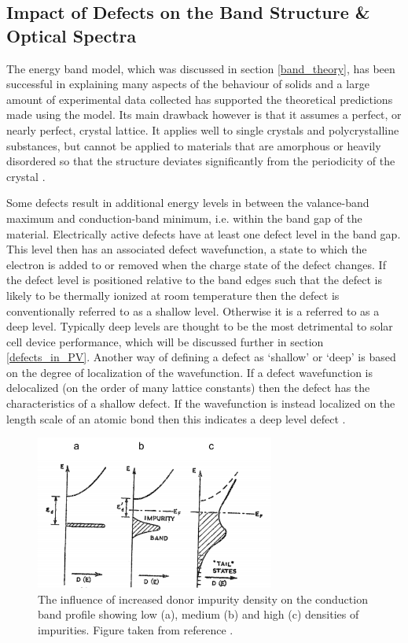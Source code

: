 \subsection{Impact of Defects on the Band Structure \& Optical Spectra}\label{PL_section}
The energy band model, which was discussed in section \ref{band_theory}, has been successful in explaining many aspects of the behaviour of solids and a large amount of experimental data collected has supported the theoretical predictions made using the model. Its main drawback however is that it assumes a perfect, or nearly perfect, crystal lattice. It applies well to single crystals and polycrystalline substances, but cannot be applied to materials that are amorphous or heavily disordered so that the structure deviates significantly from the periodicity of the crystal \cite{small_semiconductor1}. 

Some defects result in additional energy levels in between the valance-band maximum and conduction-band minimum, i.e. within the band gap of the material. Electrically active defects have at least one defect level in the band gap. This level then has an associated defect wavefunction, a state to which the electron is added to or removed when the charge state of the defect changes. If the defect level is positioned relative to the band edges such that the defect is likely to be thermally ionized at room temperature then the defect is conventionally referred to as a shallow level. Otherwise it is a referred to as a deep level. Typically deep levels are thought to be the most detrimental to solar cell device performance, which will be discussed further in section \ref{defects_in_PV}. Another way of defining a defect as `shallow' or `deep' is based on the degree of localization of the wavefunction. If a defect wavefunction is delocalized (on the order of many lattice constants) then the defect has the characteristics of a shallow defect. If the wavefunction is instead localized on the length scale of an atomic bond then this indicates a deep level defect \cite{defects_tutorial}.

\begin{figure}[h!]
  \centering
    \includegraphics[width=0.7\textwidth]{figures/bs2.png}
    \caption{The influence of increased donor impurity density on the conduction band profile showing low (a), medium (b) and high (c) densities of impurities. Figure taken from reference .}
  \label{bs2}
\end{figure}

